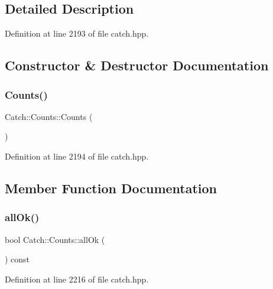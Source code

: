 \subsection{Detailed Description}


Definition at line 2193 of file catch.\+hpp.



\subsection{Constructor \& Destructor Documentation}
\hypertarget{struct_catch_1_1_counts_aab9092ce70d4b0179cc743555d2fc39b}{}\label{struct_catch_1_1_counts_aab9092ce70d4b0179cc743555d2fc39b} 
\subsubsection{\texorpdfstring{Counts()}{Counts()}}
{\footnotesize\ttfamily Catch\+::\+Counts\+::\+Counts (\begin{DoxyParamCaption}{ }\end{DoxyParamCaption})\hspace{0.3cm}{\ttfamily [inline]}}



Definition at line 2194 of file catch.\+hpp.



\subsection{Member Function Documentation}
\hypertarget{struct_catch_1_1_counts_a33bd996e016030155b99fe1c51c08991}{}\label{struct_catch_1_1_counts_a33bd996e016030155b99fe1c51c08991} 
\subsubsection{\texorpdfstring{all\+Ok()}{allOk()}}
{\footnotesize\ttfamily bool Catch\+::\+Counts\+::all\+Ok (\begin{DoxyParamCaption}{ }\end{DoxyParamCaption}) const\hspace{0.3cm}{\ttfamily [inline]}}



Definition at line 2216 of file catch.\+hpp.


